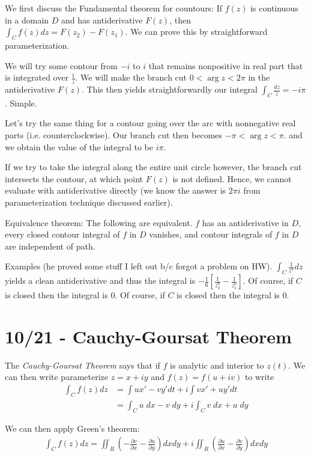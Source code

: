 \documentclass[10pt]{report}
\newcommand{\pd}[2]{\frac{\partial #1}{\partial#2}}
\begin{document}
We first discuss the Fundamental theorem for countours: If $f(z)$ is continuous in a domain $D$ and has antiderivative $F(z)$, then $\int_C f(z) dz = F(z_2) - F(z_1)$. We can prove this by straightforward parameterization.

We will try some contour from $-i$ to $i$ that remains nonpositive in real part that is integrated over $\frac{1}{z}$. We will make the branch cut $0 < \arg z < 2\pi$ in the antiderivative $F(z)$. This then yields straightforwardly our integral $\int_C \frac{dz}{z} = -i\pi$. Simple.

Let's try the same thing for a contour going over the arc with nonnegative real parts (i.e. counterclockwise). Our branch cut then becomes $-\pi < \arg z < \pi$. and we obtain the value of the integral to be $i\pi$.

If we try to take the integral along the entire unit circle however, the branch cut intersects the contour, at which point $F(z)$ is not defined. Hence, we cannot evaluate with antiderivative directly (we know the answer is $2\pi i$ from parameterization technique discussed earlier). 

Equivalence theorem: The following are equivalent. $f$ has an antiderivative in $D$, every closed contour integral of $f$ in $D$ vanishes, and contour integrals of $f$ in $D$ are independent of path.

Examples (he proved some stuff I left out b/c forgot a problem on HW). $\int_C \frac{1}{z^7} dz$ yields a clean antiderivative and thus the integral is $-\frac{1}{6}\left[ \frac{1}{z_2^6} - \frac{1}{z_1^6} \right]$. Of course, if $C$ is closed then the integral is $0$. Of course, if $C$ is closed then the integral is $0$.

\chapter{10/21 - Cauchy-Goursat Theorem}

The \emph{Cauchy-Goursat Theorem} says that if $f$ is analytic and interior to $z(t)$. We can then write parameterize $z=x+iy$  and $f(z) = f(u+iv)$ to write
\begin{align*}
	\int_C f(z) dz &= \int ux' - vy' dt + i\int vx' + uy' dt\\
	&= \int_C u\; dx - v\; dy + i\int_C v\;dx + u\; dy
\end{align*}

We can then apply Green's theorem:
\begin{align*}
	\int_C f(z) dz = \iint_R \left( -\pd{v}{x} - \pd{u}{y} \right)dx dy + i\iint_R\left( \pd{u}{x} - \pd{v}{y} \right)dx dy
\end{align*}
\end{document}
